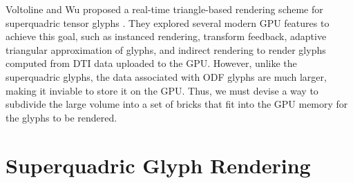 \documentclass[twoside,twocolumn,10pt]{article}
\begin{document}



Voltoline and Wu \cite{voltoline2021} proposed a real-time triangle-based rendering scheme for superquadric tensor glyphs \cite{Kindlmann2004}. They explored several modern GPU features to achieve this goal, such as instanced rendering, transform feedback, adaptive triangular approximation of glyphs, and indirect rendering to render glyphs computed from DTI data uploaded to the GPU. However, unlike the superquadric glyphs, the data associated with ODF glyphs are much larger, making it inviable to store it on the GPU. Thus, we must devise a way to subdivide the large volume into a set of bricks that fit into the GPU memory for the glyphs to be rendered.






\section{Superquadric Glyph Rendering}
\label{sec:superquadric_rendering}

\end{document}
